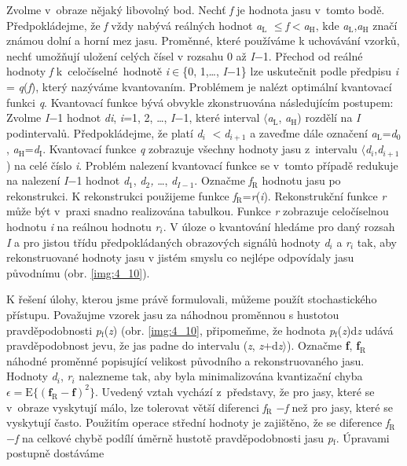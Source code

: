 Zvolme v~obraze nějaký libovolný bod. Nechť \textit{f} je hodnota jasu v~tomto bodě. Předpokládejme, že \textit{f} vždy nabývá reálných hodnot \textit{a}$_\mathrm{L}$ $\leq$\textit{f}$<$\textit{a}$_\mathrm{H}$, kde \textit{a}$_\mathrm{L}$,\textit{a}$_\mathrm{H}$ značí známou dolní a horní mez jasu. Proměnné, které používáme k uchovávání vzorků, nechť umožňují uložení celých čísel v rozsahu 0 až \textit{I}$-$1. Přechod od reálné hodnoty \textit{f} k~celočíselné~hodnotě \textit{i}$\in$\{0, 1,\dots, \textit{I}$-$1\} lze uskutečnit podle předpisu \textit{i} = \textit{q}(\textit{f}), který nazýváme kvantovaním. Problémem je nalézt optimální kvantovací funkci \textit{q}. Kvantovací funkce bývá obvykle zkonstruována následujícím postupem: Zvolme \textit{I}$-$1 hodnot \textit{di}, \textit{i}=1, 2, \dots, \textit{I}$-$1, které interval $\langle$\textit{a}$_\mathrm{L}$, \textit{a}$_\mathrm{H}$) rozdělí na \textit{I} podintervalů. Předpokládejme, že platí \textit{d}$_i$ $<$\textit{d}$_{i+1}$ a zaveďme dále označení \textit{a}$_\mathrm{L}$=\textit{d}$_0$, \textit{a}$_\mathrm{H}$=\textit{d}$_\mathrm{I}$. Kvantovací funkce \textit{q} zobrazuje všechny hodnoty jasu z~intervalu $\langle$\textit{d}$_i$,\textit{d}$_{i+1}$) na celé číslo \textit{i}. Problém nalezení kvantovací funkce se v~tomto případě redukuje na nalezení \textit{I}$-$1 hodnot \textit{d}$_1$, \textit{d}$_2$\textit{,} \dots, \textit{d}$_{I-1}$. Označme \textit{f}$_\mathrm{R}$ hodnotu jasu po rekonstrukci. K rekonstrukci použijeme funkce \textit{f}$_\mathrm{R}$=\textit{r}(\textit{i}). Rekonstrukční funkce \textit{r} může být v~praxi snadno realizována tabulkou. Funkce \textit{r} zobrazuje celočíselnou hodnotu \textit{i} na reálnou hodnotu \textit{r}$_i$. V úloze o kvantování hledáme pro daný rozsah \textit{I} a pro jistou třídu předpokládaných obrazových signálů hodnoty \textit{d}$_i$ a \textit{r}$_i$ tak, aby rekonstruované hodnoty jasu v jistém smyslu co nejlépe odpovídaly jasu původnímu (obr. \ref{img:4_10}).

K řešení úlohy, kterou jsme právě formulovali, můžeme použít stochastického přístupu. Považujme vzorek jasu za náhodnou proměnnou s hustotou pravděpodobnosti \textit{p}$_\mathrm{f}$(\textit{z}) (obr. \ref{img:4_10}, připomeňme, že hodnota \textit{p}$_\mathrm{f}$(\textit{z})d\textit{z} udává pravděpodobnost jevu, že jas padne do intervalu (\textit{z}, \textit{z}+d\textit{z}$\rangle$). Označme \textbf{f}, \textbf{f}$_\mathrm{R}$ náhodné proměnné popisující velikost původního a rekonstruovaného jasu. Hodnoty \textit{d}$_i$, \textit{r}$_i$ nalezneme tak, aby byla minimalizována kvantizační chyba $\epsilon = \mathrm{E}\{(\mathbf{f}_\mathrm{R}-\mathbf{f})^2\}$. Uvedený vztah vychází z~představy, že pro jasy, které se v~obraze vyskytují málo, lze tolerovat větší diferenci \textit{f}$_\mathrm{R}$ $-$\textit{f} než pro jasy, které se vyskytují často. Použitím operace střední hodnoty je zajištěno, že se diference \textit{f}$_\mathrm{R}$ $-$\textit{f} na celkové chybě podílí úměrně hustotě pravděpodobnosti jasu \textit{p}$_\mathrm{f}$. Úpravami postupně dostáváme

